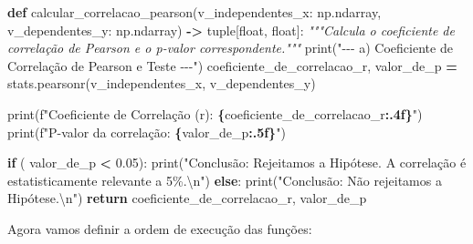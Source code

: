 \documentclass[
]{book}
\newenvironment{Shaded}{\begin{snugshade}}{\end{snugshade}}
\newcommand{\BuiltInTok}[1]{#1}
\newcommand{\CharTok}[1]{\textcolor[rgb]{0.31,0.60,0.02}{#1}}
\newcommand{\CommentTok}[1]{\textcolor[rgb]{0.56,0.35,0.01}{\textit{#1}}}
\newcommand{\ControlFlowTok}[1]{\textcolor[rgb]{0.13,0.29,0.53}{\textbf{#1}}}
\newcommand{\FloatTok}[1]{\textcolor[rgb]{0.00,0.00,0.81}{#1}}
\newcommand{\KeywordTok}[1]{\textcolor[rgb]{0.13,0.29,0.53}{\textbf{#1}}}
\newcommand{\NormalTok}[1]{#1}
\newcommand{\OperatorTok}[1]{\textcolor[rgb]{0.81,0.36,0.00}{\textbf{#1}}}
\newcommand{\SpecialCharTok}[1]{\textcolor[rgb]{0.81,0.36,0.00}{\textbf{#1}}}
\newcommand{\SpecialStringTok}[1]{\textcolor[rgb]{0.31,0.60,0.02}{#1}}
\newcommand{\StringTok}[1]{\textcolor[rgb]{0.31,0.60,0.02}{#1}}
\begin{document}
\begin{Shaded}
\begin{Highlighting}[]
\KeywordTok{def}\NormalTok{ calcular\_correlacao\_pearson(v\_independentes\_x: np.ndarray, v\_dependentes\_y: np.ndarray) }\OperatorTok{{-}\textgreater{}} \BuiltInTok{tuple}\NormalTok{[}\BuiltInTok{float}\NormalTok{, }\BuiltInTok{float}\NormalTok{]:}
    \CommentTok{"""Calcula o coeficiente de correlação de Pearson e o p{-}valor correspondente."""}
    \BuiltInTok{print}\NormalTok{(}\StringTok{"{-}{-}{-} a) Coeficiente de Correlação de Pearson e Teste {-}{-}{-}"}\NormalTok{)}
\NormalTok{    coeficiente\_de\_correlacao\_r, valor\_de\_p }\OperatorTok{=}\NormalTok{ stats.pearsonr(v\_independentes\_x, v\_dependentes\_y)}

    \BuiltInTok{print}\NormalTok{(}\SpecialStringTok{f"Coeficiente de Correlação (r): }\SpecialCharTok{\{}\NormalTok{coeficiente\_de\_correlacao\_r}\SpecialCharTok{:.4f\}}\SpecialStringTok{"}\NormalTok{)}
    \BuiltInTok{print}\NormalTok{(}\SpecialStringTok{f"P{-}valor da correlação: }\SpecialCharTok{\{}\NormalTok{valor\_de\_p}\SpecialCharTok{:.5f\}}\SpecialStringTok{"}\NormalTok{)}

    \ControlFlowTok{if}\NormalTok{ ( valor\_de\_p }\OperatorTok{\textless{}} \FloatTok{0.05}\NormalTok{):}
        \BuiltInTok{print}\NormalTok{(}\StringTok{"Conclusão: Rejeitamos a Hipótese. A correlação é estatisticamente relevante a 5\%.}\CharTok{\textbackslash{}n}\StringTok{"}\NormalTok{)}
    \ControlFlowTok{else}\NormalTok{:}
        \BuiltInTok{print}\NormalTok{(}\StringTok{"Conclusão: Não rejeitamos a Hipótese.}\CharTok{\textbackslash{}n}\StringTok{"}\NormalTok{)}
    \ControlFlowTok{return}\NormalTok{ coeficiente\_de\_correlacao\_r, valor\_de\_p}
\end{Highlighting}
\end{Shaded}

Agora vamos definir a ordem de execução das funções:
\end{document}
